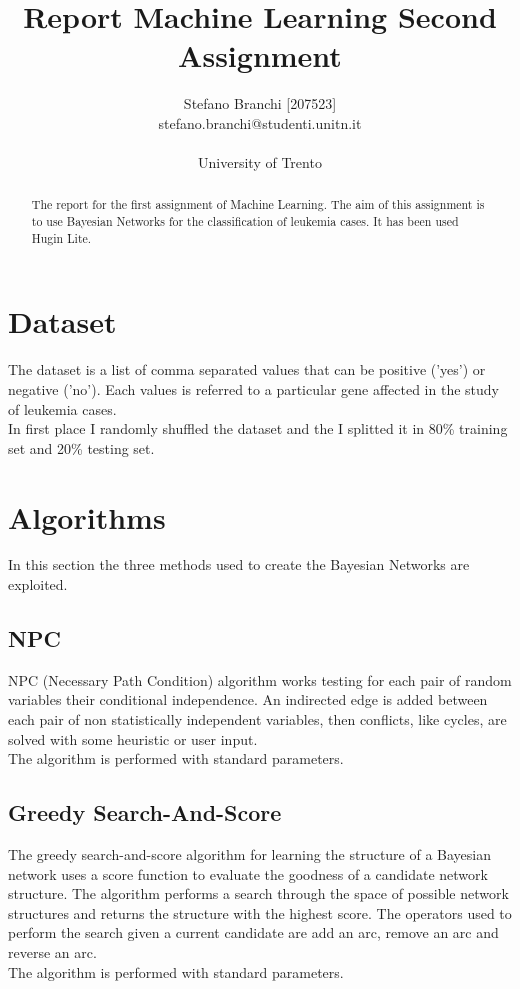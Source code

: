 \documentclass{article}
\title{Report Machine Learning Second Assignment}
\author{Stefano Branchi [207523] \\ stefano.branchi@studenti.unitn.it \\\\ University of Trento}
\date{}
\begin{document}
\maketitle
\begin{abstract}
    The report for the first assignment of Machine Learning. The aim of this assignment is to use Bayesian Networks for the classification of leukemia cases. It has been used Hugin Lite.
\end{abstract}

\section{Dataset}
The dataset is a list of comma separated values that can be positive ('yes') or negative ('no'). Each values is referred to a particular gene affected in the study of leukemia cases. \\
In first place I randomly shuffled the dataset and the I splitted it in 80\% training set and 20\% testing set. 

\section{Algorithms}
In this section the three methods used to create the Bayesian Networks are exploited.

\subsection{NPC}
NPC (Necessary Path Condition) algorithm works testing for each pair of random variables their conditional independence. An indirected edge is added between each pair of non statistically independent variables, then conflicts, like cycles, are solved with some heuristic or user input.\\
The algorithm is performed with standard parameters.

\subsection{Greedy Search-And-Score}
The greedy search-and-score algorithm for learning the structure of a Bayesian network uses a score function to evaluate the goodness of a candidate network structure. The algorithm performs a search through the space of possible network structures and returns the structure with the highest score. The operators used to perform the search given a current candidate are add an arc, remove an arc and reverse an arc.\\
The algorithm is performed with standard parameters.
\end{document}
